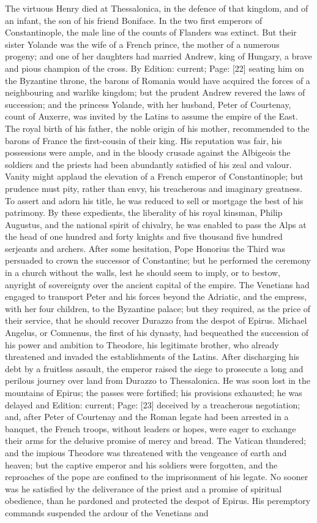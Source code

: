 The virtuous Henry died at Thessalonica, in the defence of that kingdom, and of an infant, the son of his friend Boniface. In the two first emperors of Constantinople, the male line of the counts of Flanders was extinct. But their sister Yolande was the wife of a French prince, the mother of a numerous progeny; and one of her daughters had married Andrew, king of Hungary, a brave and pious champion of the cross. By Edition: current; Page: [22] seating him on the Byzantine throne, the barons of Romania would have acquired the forces of a neighbouring and warlike kingdom; but the prudent Andrew revered the laws of succession; and the princess Yolande, with her husband, Peter of Courtenay, count of Auxerre, was invited by the Latins to assume the empire of the East. The royal birth of his father, the noble origin of his mother, recommended to the barons of France the first-cousin of their king. His reputation was fair, his possessions were ample, and in the bloody crusade against the Albigeois the soldiers and the priests had been abundantly satisfied of his zeal and valour. Vanity might applaud the elevation of a French emperor of Constantinople; but prudence must pity, rather than envy, his treacherous and imaginary greatness. To assert and adorn his title, he was reduced to sell or mortgage the best of his patrimony. By these expedients, the liberality of his royal kinsman, Philip Augustus, and the national spirit of chivalry, he was enabled to pass the Alps at the head of one hundred and forty knights and five thousand five hundred serjeants and archers. After some hesitation, Pope Honorius the Third was persuaded to crown the successor of Constantine; but he performed the ceremony in a church without the walls, lest he should seem to imply, or to bestow, anyright of sovereignty over the ancient capital of the empire. The Venetians had engaged to transport Peter and his forces beyond the Adriatic, and the empress, with her four children, to the Byzantine palace; but they required, as the price of their service, that he should recover Durazzo from the despot of Epirus. Michael Angelus, or Comnenus, the first of his dynasty, had bequeathed the succession of his power and ambition to Theodore, his legitimate brother, who already threatened and invaded the establishments of the Latins. After discharging his debt by a fruitless assault, the emperor raised the siege to prosecute a long and perilous journey over land from Durazzo to Thessalonica. He was soon lost in the mountains of Epirus; the passes were fortified; his provisions exhausted; he was delayed and Edition: current; Page: [23] deceived by a treacherous negotiation; and, after Peter of Courtenay and the Roman legate had been arrested in a banquet, the French troops, without leaders or hopes, were eager to exchange their arms for the delusive promise of mercy and bread. The Vatican thundered; and the impious Theodore was threatened with the vengeance of earth and heaven; but the captive emperor and his soldiers were forgotten, and the reproaches of the pope are confined to the imprisonment of his legate. No sooner was he satisfied by the deliverance of the priest and a promise of spiritual obedience, than he pardoned and protected the despot of Epirus. His peremptory commands suspended the ardour of the Venetians and 